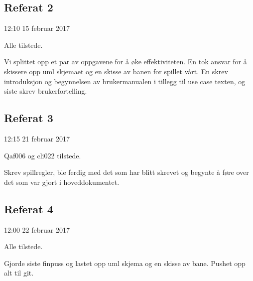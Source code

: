 \documentclass[norsk,a4paper,12 pt]{article}
\begin{document}
\subsection {Referat 2}

12:10 15 februar 2017

Alle tilstede.

Vi splittet opp et par av oppgavene for å øke effektiviteten. En tok ansvar for å skissere opp uml skjemaet og en skisse av banen for spillet vårt. En skrev introduksjon og begynnelsen av brukermanualen i tillegg til use case texten, og siste skrev brukerfortelling.

\subsection{ Referat 3}

12:15 21 februar 2017

Qaf006 og cli022 tilstede.

Skrev spillregler, ble ferdig med det som har blitt skrevet og begynte å føre over det som var gjort i hoveddokumentet.

\subsection{Referat 4}

12:00 22 februar 2017

Alle tilstede.

Gjorde siste finpuss og lastet opp uml skjema og en skisse av bane. Pushet opp alt til git.
\end{document}
